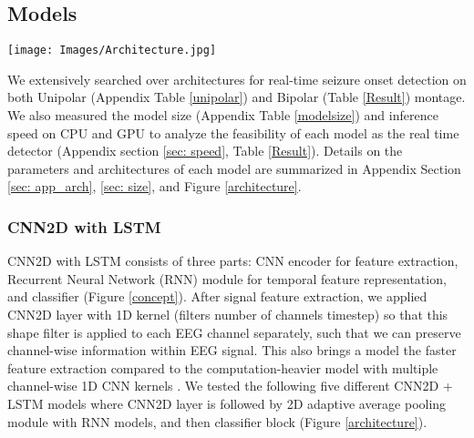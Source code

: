 \documentclass[pmlr,twocolumn,10pt]{jmlr}
\begin{document}
\subsection{Models}
\label{sec:method_model}
\begin{figure*}[h!]
	\centering
	\texttt{[image: Images/Architecture.jpg]}
    \caption{\small \textbf{Architecture of CNN2D + LSTM seizure detector} with raw EEG input. K: Kernel size, S: Stride}
	\label{architecture}
\end{figure*} We extensively searched over  architectures for real-time seizure onset detection on both Unipolar (Appendix Table \ref{unipolar}) and Bipolar (Table \ref{Result}) montage. We also measured the model size (Appendix Table \ref{modelsize}) and inference speed on CPU and GPU to analyze the feasibility of each model as the real time detector (Appendix section \ref{sec: speed}, Table \ref{Result}).
Details on the parameters and architectures of each model are summarized in Appendix Section \ref{sec: app_arch}, \ref{sec: size}, and Figure \ref{architecture}.

\subsubsection{CNN2D with LSTM}
\label{sec:CNN2DLSTM}
CNN2D with LSTM consists of three parts: CNN encoder for feature extraction, Recurrent Neural Network (RNN) module for temporal feature representation, and classifier (Figure \ref{concept}). After signal feature extraction, we applied CNN2D layer with 1D kernel (filters  number of channels  timestep) so that this shape filter is applied to each EEG channel separately, such that we can preserve channel-wise information within EEG signal. This also brings a model the faster feature extraction compared to the computation-heavier model with multiple channel-wise 1D CNN kernels \citep{priyasad2021interpretable, mohsenvand2020contrastive}. We tested the following five different CNN2D + LSTM models where CNN2D layer is followed by 2D adaptive average pooling module with RNN models, and then classifier block (Figure \ref{architecture}).
 
\end{document}
